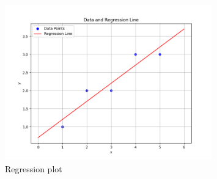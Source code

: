 \begin{figure}[H]
    \centering
    \includegraphics[width=0.8\textwidth]{assets/regression.png}
    \caption{Regression plot}
    \label{fig:regression}
\end{figure}




    